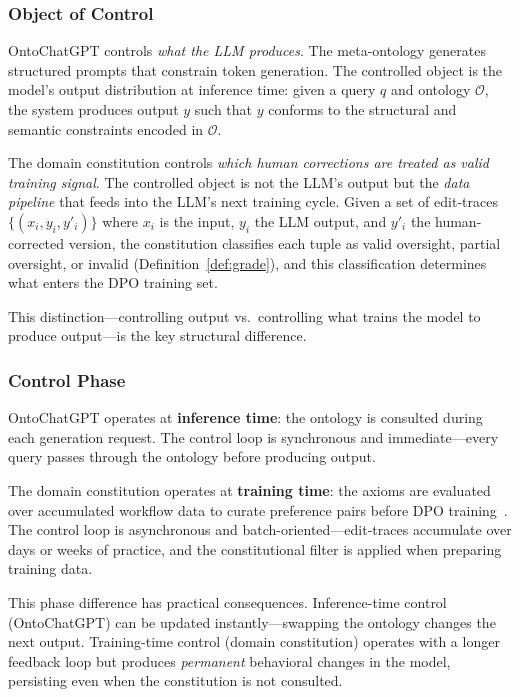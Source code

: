 \documentclass[11pt]{article}
\begin{document}
\subsubsection{Object of Control}

OntoChatGPT controls \emph{what the LLM produces}.
The meta-ontology generates structured prompts that constrain token generation.
The controlled object is the model's output distribution at inference time: given a query $q$ and ontology $\mathcal{O}$, the system produces output $y$ such that $y$ conforms to the structural and semantic constraints encoded in $\mathcal{O}$.

The domain constitution controls \emph{which human corrections are treated as valid training signal}.
The controlled object is not the LLM's output but the \emph{data pipeline} that feeds into the LLM's next training cycle.
Given a set of edit-traces $\{(x_i, y_i, y'_i)\}$ where $x_i$ is the input, $y_i$ the LLM output, and $y'_i$ the human-corrected version, the constitution classifies each tuple as valid oversight, partial oversight, or invalid (Definition~\ref{def:grade}), and this classification determines what enters the DPO training set.

This distinction---controlling output vs.\ controlling what trains the model to produce output---is the key structural difference.

\subsubsection{Control Phase}

OntoChatGPT operates at \textbf{inference time}: the ontology is consulted during each generation request.
The control loop is synchronous and immediate---every query passes through the ontology before producing output.

The domain constitution operates at \textbf{training time}: the axioms are evaluated over accumulated workflow data to curate preference pairs before DPO training~\citep{rafailov2023direct}.
The control loop is asynchronous and batch-oriented---edit-traces accumulate over days or weeks of practice, and the constitutional filter is applied when preparing training data.

This phase difference has practical consequences.
Inference-time control (OntoChatGPT) can be updated instantly---swapping the ontology changes the next output.
Training-time control (domain constitution) operates with a longer feedback loop but produces \emph{permanent} behavioral changes in the model, persisting even when the constitution is not consulted.
\end{document}
